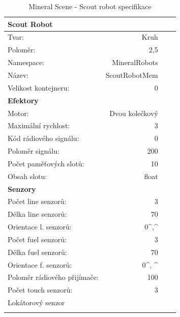 \begin{table}[h]\centering
	\begin{tabular}{l@{\hspace{1.0cm}}D{.}{,}{2.2}D{.}{,}{2.2}D{.}{,}{2.3}}
		\toprule
		\textbf{Scout Robot} \\
		\midrule
		Tvar: & Kruh\\
		Poloměr: & 2,5\\
		Namespace: & MineralRobots\\
		Název: & ScoutRobotMem \\
		Velikost kontejneru: & 0\\
		\midrule
		\textbf{Efektory} \\
		\midrule
		Motor: & Dvou kolečkový \\
		Maximální rychlost: & 3 \\
		Kód rádiového signálu: & 0\\
		Poloměr signálu: & 200\\
		Počet paměťových slotů: &10 \\
		Obsah slotu: & float\\
		\midrule
		\textbf{Senzory} \\
		\midrule
		Počet line senzorů: &  3\\
		Délka line senzorů: & 70\\
		Orientace l. senzorů: & 0^\circ,^\circ\\
		Počet fuel senzorů: &  3\\
		Délka fuel senzorů: & 70\\
		Orientace f. senzorů: & 0^\circ, ^\circ\\
		Poloměr rádiového přijímače: & 100 \\
		Počet touch senzorů: & 3 \\  
		Lokátorový senzor\\ 
		\bottomrule
	\end{tabular}
	\caption{Mineral Scene - Scout robot specifikace }
	\label{tab04:MineralScout}
\end{table}
\clearpage
